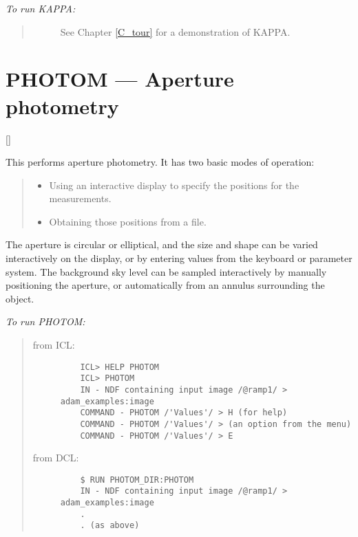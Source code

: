 {\em To run KAPPA:}\hfill
\begin{quote}
\begin{description}
\item [] See Chapter \ref{C_tour} for a demonstration of KAPPA.
\end{description}
\end{quote}

\newpage

\section{PHOTOM --- Aperture photometry}

\vspace{-11mm}

\hfill []

\vspace{5mm}

This performs aperture photometry.
It has two basic modes of operation:

{\small
\begin{quote}
\begin{itemize}
\item Using an interactive display to specify the positions for the
 measurements.
\item Obtaining those positions from a file.
\end{itemize}
\end{quote}
}

The aperture is circular or elliptical, and the size and shape can be varied
interactively on the display, or by entering values from the keyboard or
parameter system.
The background sky level can be sampled interactively by manually positioning
the aperture, or automatically from an annulus surrounding the object.

{\em To run PHOTOM:}\hfill
\begin{quote}
\begin{description}

\item [from ICL:]\hfill

\begin{small}
\begin{verbatim}
    ICL> HELP PHOTOM
    ICL> PHOTOM
    IN - NDF containing input image /@ramp1/ > adam_examples:image
    COMMAND - PHOTOM /'Values'/ > H (for help)
    COMMAND - PHOTOM /'Values'/ > (an option from the menu)
    COMMAND - PHOTOM /'Values'/ > E
\end{verbatim}
\end{small}

\item [from DCL:]\hfill

\begin{small}
\begin{verbatim}
    $ RUN PHOTOM_DIR:PHOTOM
    IN - NDF containing input image /@ramp1/ > adam_examples:image
    .
    . (as above)
\end{verbatim}
\end{small}

\end{description}
\end{quote}

